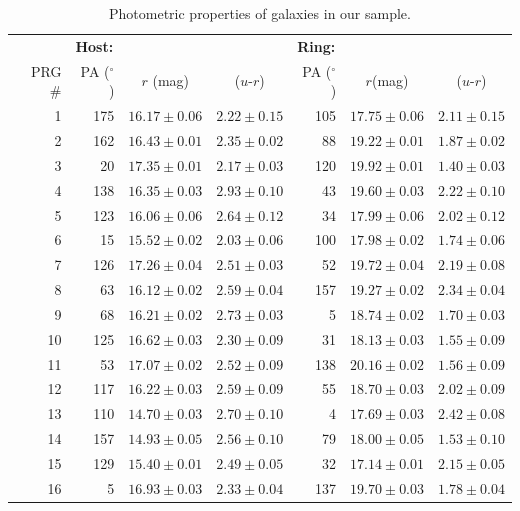 \documentclass[useAMS,usenatbib]{mn2e}
\begin{document}
\begin{table}
 \centering
  \caption{Photometric properties of galaxies in our sample.
  \label{t:colour}}
\begin{tabular}{rrccrcc}
\hline
{} &  \multicolumn{3}{l}{{\bf Host:}} & \multicolumn{3}{l}{{\bf Ring:}}\\
PRG \#  &   PA ($^\circ$) & $r$ (mag) & ($u$-$r$) & PA ($^\circ$) & $r$(mag) & ($u$-$r$)         \\
\hline
{1} & 175 & $16.17\pm0.06$ & $2.22\pm0.15$ & 105 &$17.75\pm0.06$ & $2.11\pm0.15$ \\
{2} & 162 & $16.43\pm0.01$ & $2.35\pm0.02$ & 88 &$19.22\pm0.01$ & $1.87\pm0.02$ \\
{3} & 20 & $17.35\pm0.01$ & $2.17\pm0.03$ & 120 & $19.92\pm0.01$ & $1.40\pm0.03$  \\
{4} & 138 & $16.35\pm0.03$ & $2.93\pm0.10$ & 43 & $19.60\pm0.03$ & $2.22\pm0.10$ \\
{5} & 123 & $16.06\pm0.06$ & $2.64\pm0.12$ & 34 & $17.99\pm0.06$ & $2.02\pm0.12$ \\
{6} & 15 & $15.52\pm0.02$ & $2.03\pm0.06$ & 100 & $17.98\pm0.02$ & $1.74\pm0.06$ \\
{7} & 126 & $17.26\pm0.04$ & $2.51\pm0.03$ & 52 & $19.72\pm0.04$ & $2.19\pm0.08$ \\
{8} & 63 & $16.12\pm0.02$ & $2.59\pm0.04$ & 157 & $19.27\pm0.02$ & $2.34\pm0.04$ \\
{9} & 68 & $16.21\pm0.02$ & $2.73\pm0.03$ & 5 & $18.74\pm0.02$ & $1.70\pm0.03$  \\
{10} & 125 & $16.62\pm0.03$ & $2.30\pm0.09$ & 31 & $18.13\pm0.03$ & $1.55\pm0.09$  \\
{11}& 53 & $17.07\pm0.02$ & $2.52\pm0.09$ & 138 & $20.16\pm0.02$ & $1.56\pm0.09$  \\
{12}& 117 & $16.22\pm0.03$ & $2.59\pm0.09$ & 55 &$18.70\pm0.03$ & $2.02\pm0.09$  \\
{13}& 110 & $14.70\pm0.03$ & $2.70\pm0.10$ & 4 & $17.69\pm0.03$ & $2.42\pm0.08$ \\
{14}& 157 & $14.93\pm0.05$ & $2.56\pm0.10$ & 79 & $18.00\pm0.05$ & $1.53\pm0.10$  \\
{15}& 129 & $15.40\pm0.01$ & $2.49\pm0.05$ & 32 & $17.14\pm0.01$ & $2.15\pm0.05$ \\
{16}& 5 & $16.93\pm0.03$ & $2.33\pm0.04$ & 137 & $19.70\pm0.03$ & $1.78\pm0.04$  \\
\hline
\end{tabular}
\end{table}
\end{document}
